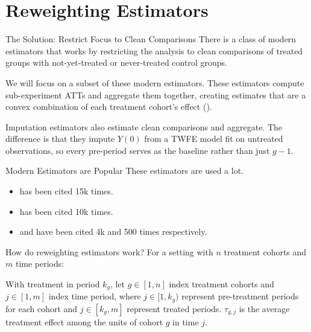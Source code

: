 \documentclass[11pt]{beamer}
\begin{document}
\section{Reweighting Estimators}

\begin{frame}{The Solution: Restrict Focus to Clean Comparisons}
    There is a class of modern estimators that works by restricting the analysis to clean comparisons of treated groups with not-yet-treated or never-treated control groups.

    \vspace{2.5mm}

   We will focus on a subset of these modern estimators. These estimators compute sub-experiment ATTs and aggregate them together, creating estimates that are a convex combination of each treatment cohort's effect (\cite{callaway2021difference, sun2021estimating, baker2026difference}). 

   \footnotesize 
   \vspace{5mm}
   
   Imputation estimators \parencite{borusyak2024revisiting} also estimate clean comparisons and aggregate. The difference is that they impute $Y(0)$ from a TWFE model fit on untreated observations, so every pre-period serves as the baseline rather than just $g-1$.
\end{frame}

\begin{frame}{Modern Estimators are Popular}
    These estimators are used a lot.
    \begin{itemize}
        \item \textcite{callaway2021difference} has been cited 15k times.
        \item \textcite{sun2021estimating} has been cited 10k times.
        \item \textcite{cengiz2019effect} and \textcite{wing2024stacked} have been cited 4k and 500 times respectively.
    \end{itemize}
\end{frame}


\begin{frame}{How do reweighting estimators work?}
    For a setting with $n$ treatment cohorts and $m$ time periods:
    
    \vspace{2.5mm}

    

    With treatment in period $k_g$, let $g \in [1,n]$ index treatment cohorts and $j \in [1,m]$ index time period, where $j \in [1,k_g)$ represent pre-treatment periods for each cohort and $j \in [k_g,m]$ represent treated periods. $\tau_{g,j}$ is the average treatment effect among the units of cohort $g$ in time $j$.

 

\end{frame}
\end{document}
